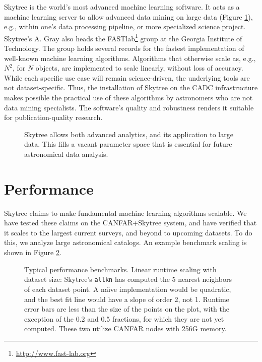 Skytree is the world's most advanced machine learning software. It acts as a machine learning server to allow advanced data mining on large data (Figure \ref{Fig: Skytree}), e.g., within one's data processing pipeline, or more specialized science project. Skytree's A. Gray also heads the FASTlab\footnote{\url{http://www.fast-lab.org}} group at the Georgia Institute of Technology. The group holds several records for the fastest implementation of well-known machine learning algorithms. Algorithms that otherwise scale as, e.g., $N^2$, for $N$ objects, are implemented to scale linearly, without loss of accuracy. While each specific use case will remain science-driven, the underlying tools are not dataset-specific. Thus, the installation of Skytree on the CADC infrastructure makes possible the practical use of these algorithms by astronomers who are not data mining specialists. The software's quality and robustness renders it suitable for publication-quality research.

\begin{figure}
\caption{Skytree allows both advanced analytics, and its application to large data. This fills a vacant parameter space that is essential for future astronomical data analysis. \label{Fig: Skytree}}
\end{figure}

\section{Performance} \label{Sec: Performance}

Skytree claims to make fundamental machine learning algorithms scalable. We have tested these claims on the CANFAR+Skytree system, and have verified that it scales to the largest current surveys, and beyond to upcoming datasets. To do this, we analyze large astronomical catalogs. An example benchmark scaling is shown in Figure \ref{Fig: runtime}.

\begin{figure}
\caption{Typical performance benchmarks. Linear runtime scaling with dataset size: Skytree's {\tt allkn} has computed the 5 nearest neighbors of each dataset point. A na\"{\i}ve implementation would be quadratic, and the best fit line would have a slope of order 2, not 1. Runtime error bars are less than the size of the points on the plot, with the exception of the 0.2 and 0.5 fractions, for which they are not yet computed. These two utilize CANFAR nodes with 256G memory. \label{Fig: runtime}}
\end{figure}

